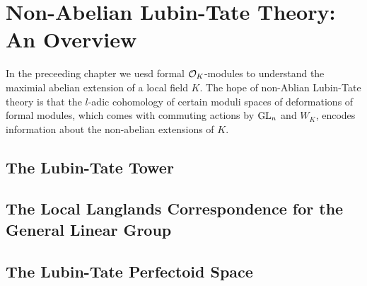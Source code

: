 \documentclass[../main.tex]{subfiles}
\begin{document}
\section{Non-Abelian Lubin-Tate Theory: An Overview} %
\label{sec:Non-Abelian Lubin-Tate Theory: An Overview}
In the preceeding chapter we uesd formal $\mathcal{O}_K$-modules to understand the 
maximial abelian extension of a local field $K$. The hope of non-Ablian Lubin-Tate
theory is that the $l$-adic cohomology of certain moduli spaces of 
deformations of formal modules, which comes with commuting actions by $\operatorname{GL}_n$ 
and $W_K$, encodes information about the non-abelian extensions of $K$. 

\subsection{The Lubin-Tate Tower} %
\label{sub:The Lubin-Tate Tower}



\subsection{The Local Langlands Correspondence for the General Linear Group} %
\label{sub:The Local Langlands Correspondence for the General Linear Group}


\subsection{The Lubin-Tate Perfectoid Space} %
\label{sub:The Lubin-Tate Perfectoid Space}


\end{document}
